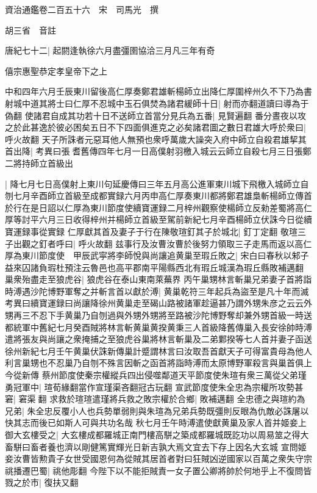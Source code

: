 資治通鑑卷二百五十六　宋　司馬光　撰

胡三省　音註

唐紀七十二|{
	起閼逢執徐六月盡彊圉協洽三月凡三年有奇}


僖宗惠聖恭定孝皇帝下之上

中和四年六月壬辰東川留後高仁厚奏鄭君雄斬楊師立出降仁厚圍梓州久不下乃為書射城中道其將士曰仁厚不忍城中玉石俱焚為諸君緩師十日|{
	射而亦翻道讀曰導為于偽翻}
使諸君自成其功若十日不送師立首當分見兵為五番|{
	見賢遍翻}
番分晝夜以攻之於此甚逸於彼必困矣五日不下四面俱進克之必矣諸君圖之數日君雄大呼於衆曰|{
	呼火故翻}
天子所誅者元惡耳他人無預也衆呼萬歲大譟突入府中師立自殺君雄挈其首出降|{
	考異曰張耆舊傳四年七月一日高僕射羽檄入城云云師立自殺七月三日張鄭二將持師立首級出}


|{
	降七月七日高僕射上東川句延慶傳曰三年五月高公進軍東川城下飛檄入城師立自刎七月辛酉師立首級至成都實録六月丙申高仁厚奏東川都將鄭君雄梟斬楊師立傳首於行在是日詔以仁厚為東川節度使續寶運録二月梓州觀察使楊師立反勑差蜀將高仁厚等討平六月三日收得梓州并楊師立首級至駕前新紀七月辛酉楊師立伏誅今日從續寶運録事從實録}
仁厚獻其首及妻子于行在陳敬瑄釘其子於城北|{
	釘丁定翻}
敬瑄三子出觀之釘者呼曰|{
	呼火故翻}
兹事行及汝曹汝曹於後努力領取三子走馬而返以高仁厚為東川節度使　甲辰武寜將李師悅與尚讓追黄巢至瑕丘敗之|{
	宋白曰春秋以邾子益來囚諸負瑕杜預注云魯邑也高平郡南平陽縣西北有瑕丘城漢為瑕丘縣敗補邁翻}
巢衆殆盡走至狼虎谷|{
	狼虎谷在泰山東南萊蕪界}
丙午巢甥林言斬巢兄弟妻子首將詣時溥遇沙陀博野軍奪之并斬言首以獻於溥|{
	黄巢乾符三年起兵為盜至是凡十年而滅　考異曰續寶運録曰尚讓降徐州黄巢走至碣山路被諸軍趁逼甚乃謂外甥朱彦之云云外甥再三不忍下手黄巢乃自刎過與外甥外甥將至路被沙陀博野奪却兼外甥首級一時送都統軍中舊紀七月癸酉賊將林言斬黄巢黄揆黄秉三人首級降舊傳巢入長安徐帥時溥遣將張友與尚讓之衆掩捕之至狼虎谷巢將林言斬巢及二弟鄴揆等七人首并妻子函送徐州新紀七月壬午黄巢伏誅新傳巢計蹙謂林言曰汝取吾首獻天子可得富貴母為他人利言巢甥也不忍巢乃自刎不殊言因斬之函首將詣時溥而太原博野軍殺言與巢首俱上今從新傳}
蔡州節度使秦宗權縱兵四出侵噬鄰道天平節度使朱瑄有衆三萬從父弟瑾勇冠軍中|{
	瑄荀緣翻當作宣瑾渠吝翻冠古玩翻}
宣武節度使朱全忠為宗權所攻勢甚窘|{
	窘渠翻}
求救於瑄瑄遣瑾將兵救之敗宗權於合鄉|{
	敗補邁翻}
全忠德之與瑄約為兄弟|{
	朱全忠反覆小人也兵勢單弱則與朱瑄為兄弟兵勢既彊則反眼為仇敵必誅屠以快其志而後已如斯人可與共功名哉}
秋七月壬午時溥遣使獻黄巢及家人首并姬妾上御大玄樓受之|{
	大玄樓成都羅城正南門樓高駢之築成都羅城既訖功以周易筮之得大畜駢曰畜者養也濟以剛健篤實輝光日新吉孰大焉文宜去下存上因名大玄城}
宣問姬妾汝曹皆勲貴子女世受國恩何為從賊其居首者對曰狂賊凶逆國家以百萬之衆失守宗祧播遷巴蜀|{
	祧他彫翻}
今陛下以不能拒賊責一女子置公卿將帥於何地乎上不復問皆戮之於市|{
	復扶又翻}
